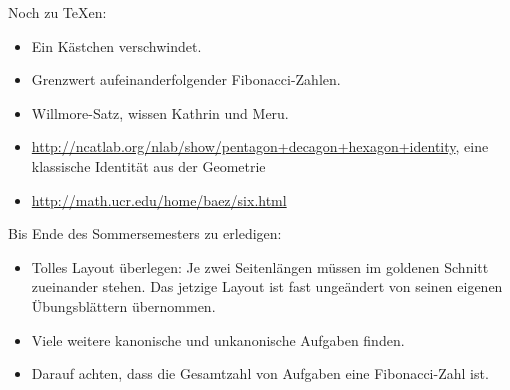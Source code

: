 \documentclass[a4paper,ngerman]{scrartcl}
\begin{document}
\vfill

Noch zu \TeX{}en:
\begin{itemize}
\item Ein Kästchen verschwindet.
\item Grenzwert aufeinanderfolgender Fibonacci-Zahlen.
\item Willmore-Satz, wissen Kathrin und Meru.
\item \url{http://ncatlab.org/nlab/show/pentagon+decagon+hexagon+identity},
eine klassische Identität aus der Geometrie
\item \url{http://math.ucr.edu/home/baez/six.html}
\end{itemize}

Bis Ende des Sommersemesters zu erledigen:
\begin{itemize}
\item Tolles Layout überlegen: Je zwei Seitenlängen müssen im goldenen Schnitt
zueinander stehen. Das jetzige Layout ist fast ungeändert von seinen eigenen
Übungsblättern übernommen.
\item Viele weitere kanonische und unkanonische Aufgaben finden.
\item Darauf achten, dass die Gesamtzahl von Aufgaben eine Fibonacci-Zahl ist.
\end{itemize}
\end{document}
